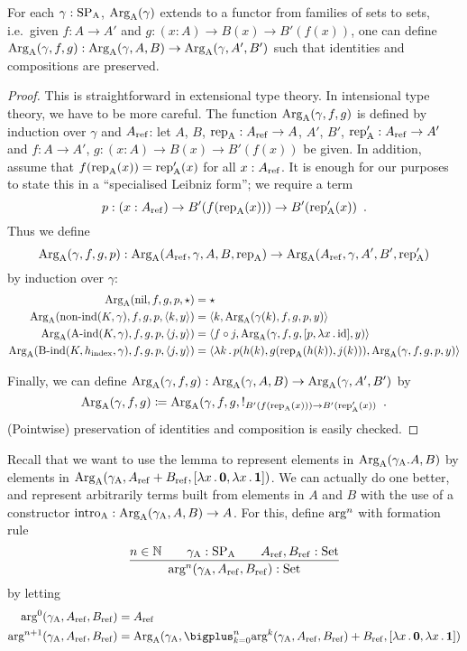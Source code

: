 \documentclass{article}
\begin{document}
\begin{lemma} %
  For each $\gamma : \text{SP}_{\mathrm{A}}$, $\text{Arg}_{\mathrm{A}}(\gamma)$ extends to a functor from
  families of sets to sets, i.e.\ given $f : A \to A'$ and $g : (x :
  A) \to B(x) \to B'(f(x))$, one can define $\text{Arg}_{\mathrm{A}}(\gamma, f, g) :
  \text{Arg}_{\mathrm{A}}(\gamma, A, B) \to \text{Arg}_{\mathrm{A}}(\gamma, A', B')$ such that identities
  and compositions are preserved.
\end{lemma}
\begin{proof} %

  This is straightforward in extensional type theory. In intensional
  type theory, we have to be more careful. The function $\text{Arg}_{\mathrm{A}}(\gamma,
  f, g)$ is defined by induction over $\gamma$ and $A_{\mathrm{ref}}$: let $A$,
  $B$, $\text{rep}_{\mathrm{A}} : A_{\mathrm{ref}} \to A$, $A'$, $B'$, $\text{rep}_{\mathrm{A}}' : A_{\mathrm{ref}} \to A'$ and
  $f : A \to A'$, $g : (x : A) \to B(x) \to B'(f(x))$ be given. In
  addition, assume that $f(\text{rep}_{\mathrm{A}}(x)) = \text{rep}_{\mathrm{A}}'(x)$ for all $x :
  A_{\mathrm{ref}}$. It is enough for our purposes to state this in a
  ``specialised Leibniz form''; we require a term
  \[
  p : (x : A_{\mathrm{ref}}) \to B'(f(\text{rep}_{\mathrm{A}}(x))) \to B'(\text{rep}_{\mathrm{A}}'(x)) \enspace .
  \]
  Thus we define
  \[
  \ArgA(\gamma, f, g, p) : %
  \ArgA(\Aref, \gamma, A, B, \repA)
  \to \ArgA(\Aref, \gamma, A', B', \repA')
  \]
  by induction over $\gamma$:
  \begin{align*}
    \text{Arg}_{\mathrm{A}}(\text{nil}, f, g, p, \star) &= \star\\
    \text{Arg}_{\mathrm{A}}(\text{non-ind}(K, \gamma), f, g, p, \langle k , y\rangle) &= \langle k , \text{Arg}_{\mathrm{A}}(\gamma(k), f, g, p, y)\rangle\\
    \text{Arg}_{\mathrm{A}}(\text{A-ind}(K, \gamma), f, g, p, \langle j , y\rangle) &= \langle f \circ j , \text{Arg}_{\mathrm{A}}(\gamma, f, g, [p, \lambda x\,.\,\text{id}], y)\rangle\\
    \text{Arg}_{\mathrm{A}}(\text{B-ind}(K, h_{\mathrm{index}}, \gamma), f, g, p, \langle j , y\rangle) &= \langle \lambda k\,.\,p(h(k), g(\text{rep}_{\mathrm{A}}(h(k)), j(k))) , \text{Arg}_{\mathrm{A}}(\gamma, f, g, p, y)\rangle
  \end{align*}
  
  Finally, we can define $\text{Arg}_{\mathrm{A}}(\gamma, f, g) : \text{Arg}_{\mathrm{A}}(\gamma, A, B) \to
  \text{Arg}_{\mathrm{A}}(\gamma, A', B')$ by
  \[
  \text{Arg}_{\mathrm{A}}(\gamma, f, g) \coloneqq \text{Arg}_{\mathrm{A}}(\gamma,f, g, !_{B'(f(\text{rep}_{\mathrm{A}}(x))) \to B'(\text{rep}_{\mathrm{A}}'(x))} \enspace .
  \]
  (Pointwise) preservation of identities and composition is easily checked.
\end{proof}

Recall that we want to use the lemma to represent elements in
$\text{Arg}_{\mathrm{A}}(\gamma_{\mathrm{A}}. A, B)$ by elements in $\text{Arg}_{\mathrm{A}}(\gamma_{\mathrm{A}}, A_{\mathrm{ref}} +B_{\mathrm{ref}},
[\lambda x\,.\,\mathbf{0}, \lambda x\,.\,\mathbf{1}])$. We can actually do one
better, and represent arbitrarily terms built from elements in $A$ and
$B$ with the use of a constructor $\text{intro}_{\mathrm{A}} : \text{Arg}_{\mathrm{A}}(\gamma_{\mathrm{A}}, A, B) \to
A$. For this, define $\text{arg}^{n}$ with formation rule
%
\[
\infer{\argn{n}(\gammaA, \Aref, \Bref) : \Set}{n \in \Nat & \quad \gammaA : \SPA & \quad \Aref, \Bref : \Set}
\]
%
by letting
\begin{align*}
\argn{0}(\gammaA, \Aref, \Bref) &= \Aref \\
\argn{n + 1}(\gammaA, \Aref, \Bref) &= \ArgA(\gammaA, \bigplus_{k = 0}^n \argn{k}(\gammaA, \Aref, \Bref) + \Bref,  [\lambda x\,.\,\zero, \lambda x\,.\,\one])
\end{align*}
\end{document}
